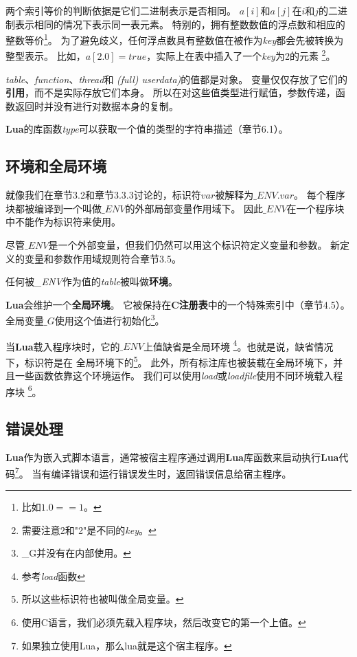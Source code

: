 \documentclass{ctexart}
\begin{document}
两个索引等价的判断依据是它们二进制表示是否相同。
$a[i]$和$a[j]$在$i$和$j$的二进制表示相同的情况下表示同一表元素。
特别的，拥有整数数值的浮点数和相应的整数等价\footnote{比如$1.0==1$。}。
为了避免歧义，任何浮点数具有整数值在被作为\emph{key}都会先被转换为整型表示。
比如，$a[2.0]=true$，实际上在表中插入了一个\emph{key}为2的元素
\footnote{需要注意2和"2"是不同的\emph{key}。}。

\emph{table}、\emph{function}、\emph{thread}和
\emph{(full) userdata)}的值都是对象。
变量仅仅存放了它们的\textbf{引用}，而不是实际存放它们本身。
所以在对这些值类型进行赋值，参数传递，函数返回时并没有进行对数据本身的复制。

\textbf{Lua}的库函数\emph{type}可以获取一个值的类型的字符串描述（章节6.1）。

\subsection{环境和全局环境}

就像我们在章节3.2和章节3.3.3讨论的，标识符$var$被解释为$\_ENV.var$。
每个程序块都被编译到一个叫做$\_ENV$的外部局部变量作用域下。
因此$\_ENV$在一个程序块中不能作为标识符来使用。

尽管$\_ENV$是一个外部变量，但我们仍然可以用这个标识符定义变量和参数。
新定义的变量和参数作用域规则符合章节3.5。

任何被\emph{\_ENV}作为值的\emph{table}被叫做\textbf{环境}。

\textbf{Lua}会维护一个\textbf{全局环境}。
它被保持在\textbf{C注册表}中的一个特殊索引中（章节4.5）。
全局变量$\_G$使用这个值进行初始化\footnote{\_G并没有在内部使用。}。

当\textbf{Lua}载入程序块时，它的$\_ENV$上值缺省是全局环境
\footnote{参考\emph{load}函数}。也就是说，缺省情况下，标识符是在
全局环境下的\footnote{所以这些标识符也被叫做全局变量。}。
此外，所有标注库也被装载在全局环境下，并且一些函数依靠这个环境运作。
我们可以使用\emph{load}或\emph{loadfile}使用不同环境载入程序块
\footnote{使用C语言，我们必须先载入程序块，然后改变它的第一个上值。}。


\subsection{错误处理}

\textbf{Lua}作为嵌入式脚本语言，通常被宿主程序通过调用\textbf{Lua}库函数来启动执行\textbf{Lua}代码\footnote{如果独立使用Lua，那么lua就是这个宿主程序。}。
当有编译错误和运行错误发生时，返回错误信息给宿主程序。
\end{document}
